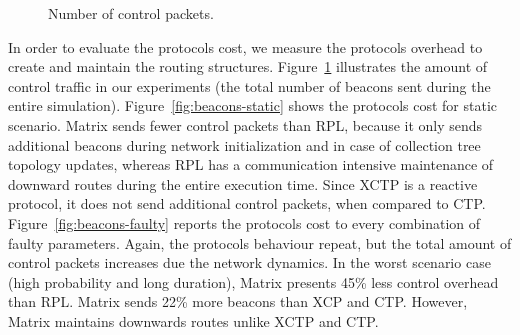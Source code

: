 \begin{figure}[t]
    \centering
    
    
    \caption{Number of control packets.}
    \label{fig:beacons}
\end{figure}

In order to evaluate the protocols cost, we measure the protocols overhead to create and maintain the routing structures. Figure~\ref{fig:beacons} illustrates the amount of control traffic in our experiments (the total number of beacons sent during the entire simulation). Figure~\ref{fig:beacons-static} shows the protocols cost for static scenario. Matrix sends fewer control packets than RPL, because it only sends additional beacons during network initialization and in case of collection tree topology updates, whereas RPL has a communication intensive maintenance of downward routes during the entire execution time. Since XCTP is a reactive protocol, it does not send additional control packets, when compared to CTP. Figure~\ref{fig:beacons-faulty} reports the protocols cost to every combination of faulty parameters. Again, the protocols behaviour repeat, but the total amount of control packets increases due the network dynamics. In the worst scenario case (high probability and long duration), Matrix presents 45\% less control overhead than RPL. Matrix sends 22\% more beacons than XCP and CTP. However, Matrix maintains downwards routes unlike XCTP and CTP.

